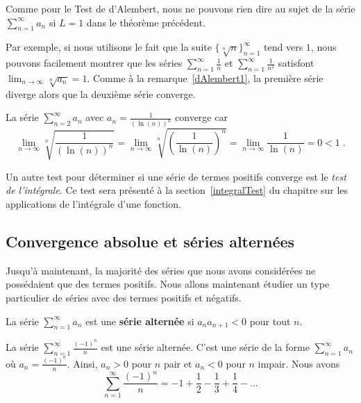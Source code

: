 {\begin{rmk}
Comme pour le Test de d'Alembert, nous ne pouvons rien dire au sujet
de la série
$\displaystyle \sum_{n=1}^\infty a_n$ si $L=1$ dans le théorème précédent. 

Par exemple, si nous utilisons le fait que la suite
$\{ \sqrt[n]{n} \}_{n=1}^\infty$ tend vers $1$, nous pouvons
facilement montrer que les séries
$\displaystyle \sum_{n=1}^\infty \frac{1}{n}$ et
$\displaystyle \sum_{n=1}^\infty \frac{1}{n^2}$ satisfont
$\displaystyle \lim_{n\rightarrow \infty} \sqrt[n]{a_n} = 1$.
Comme à la remarque~\ref{dAlembert1}, la première série diverge alors
que la deuxième série converge.
\end{rmk}

\begin{egg}
La série $\displaystyle \sum_{n=2}^\infty a_n$ avec
$\displaystyle a_n = \frac{1}{(\ln(n))^n}$ converge car
\[
\lim_{n\rightarrow \infty} \sqrt[n]{\frac{1}{(\ln(n))^n}} =
\lim_{n\rightarrow \infty} \sqrt[n]{\left(\frac{1}{\ln(n)}\right)^n} =
\lim_{n\rightarrow \infty} \frac{1}{\ln(n)} = 0 < 1 \; .
\]
\end{egg}

Un autre test pour déterminer si une série de termes positifs converge
est le {\em test de l'intégrale}.  Ce test sera présenté à la
section~\ref{integralTest} du chapitre sur les applications de
l'intégrale d'une fonction.

\subsection{Convergence absolue et séries alternées \eng}\label{serie_alt}

Jusqu'à maintenant, la majorité des séries que nous avons considérées
ne possédaient que des termes positifs.  Nous allons maintenant
étudier un type particulier de séries avec des termes positifs et
négatifs.

\begin{defn} 
La série $\displaystyle \sum_{n=1}^\infty a_n$ est une
{\bfseries série alternée} si $a_n a_{n+1} < 0$
pour tout $n$.
\end{defn}

\begin{egg}
La série $\displaystyle \sum_{n=1}^\infty \frac{(-1)^n}{n}$ est une
série alternée.  C'est une série de la forme
$\displaystyle \sum_{n=1}^\infty a_n$ où
$\displaystyle a_n = \frac{(-1)^n}{n}$.  Ainsi,
$a_n >0$ pour $n$ pair et $a_n <0$ pour $n$ impair.  Nous avons
\[
\sum_{n=1}^\infty \frac{(-1)^n}{n} = -1 + \frac{1}{2} - \frac{1}{3} +
\frac{1}{4} - \ldots
\]
\end{egg}

}
